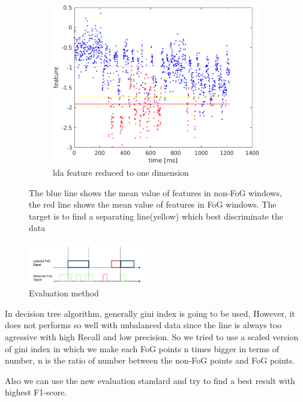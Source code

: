 \documentclass[article]{article}
\begin{document}
	\begin{figure}		
	\begin{subfigure}[b]{0.45\textwidth}
		\centering
		\includegraphics[width=\textwidth]{classifier}
		\caption{lda feature reduced to one dimension}
		\label{fig:y equals x}
	\end{subfigure}
	\caption{The blue line shows the mean value of features in non-FoG windows, the red line shows the mean value of features in FoG windows. The target is to find a separating line(yellow) which best discriminate the data}
	\label{fig:three graphs}
	\end{figure}
\begin{figure}		
	\centering
	\includegraphics[width=0.45\textwidth]{evaluation}
	\caption{Evaluation method}
	\label{fig:y equals x}	
\end{figure}
	In decision tree algorithm, generally gini index is going to be used, However, it does not performs so well with unbalanced data since the line is always too agressive with high Recall and low precision. So we tried to use a  scaled version of gini index in which we make each FoG points n times bigger in terms of number, n is the ratio of number between the non-FoG points and FoG points.
	
	Also we can use the new evaluation standard and try to find a best result with highest F1-score.
	
\end{document}
